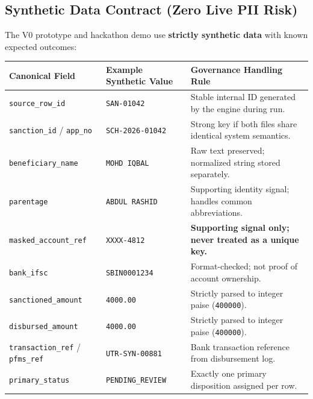 \documentclass[11pt,a4paper]{article}
\newcommand{\code}[1]{\texttt{#1}}
\begin{document}
\subsection{Synthetic Data Contract (Zero Live PII Risk)}
The V0 prototype and hackathon demo use \textbf{strictly synthetic data} with known expected outcomes:

\vspace{0.15cm}
\noindent
\begin{tabularx}{\textwidth}{|l|l|Y|}
\hline
\textbf{Canonical Field} & \textbf{Example Synthetic Value} & \textbf{Governance Handling Rule} \\
\hline
\code{source\_row\_id} & \code{SAN-01042} & Stable internal ID generated by the engine during run. \\
\hline
\code{sanction\_id} / \code{app\_no} & \code{SCH-2026-01042} & Strong key if both files share identical system semantics. \\
\hline
\code{beneficiary\_name} & \code{MOHD IQBAL} & Raw text preserved; normalized string stored separately. \\
\hline
\code{parentage} & \code{ABDUL RASHID} & Supporting identity signal; handles common abbreviations. \\
\hline
\code{masked\_account\_ref} & \code{XXXX-4812} & \textbf{Supporting signal only; never treated as a unique key.} \\
\hline
\code{bank\_ifsc} & \code{SBIN0001234} & Format-checked; not proof of account ownership. \\
\hline
\code{sanctioned\_amount} & \code{4000.00} & Strictly parsed to integer paise (\code{400000}). \\
\hline
\code{disbursed\_amount} & \code{4000.00} & Strictly parsed to integer paise (\code{400000}). \\
\hline
\code{transaction\_ref} / \code{pfms\_ref} & \code{UTR-SYN-00881} & Bank transaction reference from disbursement log. \\
\hline
\code{primary\_status} & \code{PENDING\_REVIEW} & Exactly one primary disposition assigned per row. \\
\hline
\end{tabularx}
\end{document}

